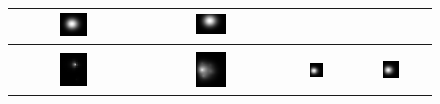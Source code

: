 \documentclass[acmsmall,review,anonymous]{acmart}\settopmatter{printfolios=true,printccs=false,printacmref=false}
\begin{document}
\begin{figure}
\begin{tabular}{cccc}
\includegraphics[width=0.23\textwidth]{images/true-field-t=3597} & 
\includegraphics[width=0.23\textwidth]{images/true-field-t=4089} \\
\hline \\
\includegraphics[width=0.23\textwidth]{images/field-t=50} & 
\includegraphics[width=0.23\textwidth]{images/field-t=641} &
\includegraphics[width=0.23\textwidth]{images/field-t=1232} & 
\includegraphics[width=0.23\textwidth]{images/field-t=1823} \\

\end{tabular}
\end{figure}
\end{document}
